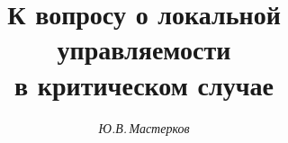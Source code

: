 




% 





\newcommand{\vfi}{\varphi}


\newcommand{\al}{\alpha}


\newcommand{\ls}{\leqslant}


\newcommand{\rs}{\geqslant}


\newcommand{\R}{\Bbb R}


\newcommand{\de}{\doteq}


\newcommand{\fy}{\infty}


\newcommand{\Pt}{\partial}


\newcommand{\ve}{\varepsilon}


\newcommand{\lr}{\longrightarrow}


\newcommand{\intr}{\operatorname{int}}


\newcommand{\rank}{\operatorname{rank}}


\newcommand{\tts}[1]{}







 


\setcounter{page}{68}















\author{\it Ю.В.\,Мастерков}




\title{К вопросу о локальной управляемости\\


в критическом случае}


